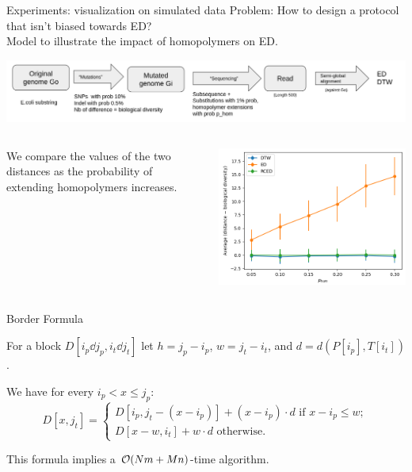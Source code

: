  

\begin{frame}{Experiments: visualization on simulated data}
  Problem: How to design a protocol that isn't biased towards ED?\\
  Model to illustrate the impact of homopolymers on ED.
  \begin{center}
    \includegraphics[scale=0.2]{figures/pipeline.png}
  \end{center}
  \vspace{-0.5cm}
  \begin{columns}
    
    We compare the values of the two distances as the probability of extending homopolymers increases.
    
    \begin{center}
      \includegraphics[scale=0.4]{figures/ecoli_10kb_N_100_fixed_ID_0.0005.png}
    \end{center}
  \end{columns}
\end{frame}


\begin{frame}{Border Formula}
  \begin{center}
    
  \end{center}
  
  \small
  For a block $D[i_p \dd j_p, i_t \dd j_t]$ let $h=j_p-i_p$, $w =j_t-i_t$, and $d=d(P[i_p],T[i_t])$.
  
  
  We have for every $i_p < x \leq j_p$:
  \[
  D[x,j_t]= \begin{cases}
  D[i_p,j_t-(x-i_p)]+(x-i_p) \cdot d \text{ if } x-i_p \leq w; \\
  D[x-w,i_t]+w \cdot d \text{ otherwise}.
  \end{cases}
  \]
  
  This formula implies a $\mathcal{O}(Nm+ Mn)$-time algorithm.
  \end{frame}
  
